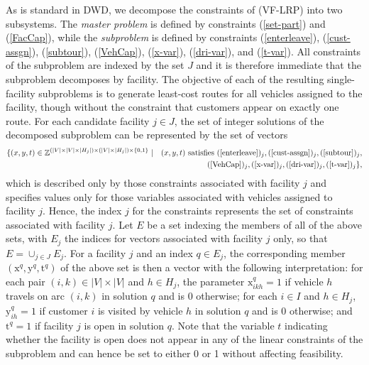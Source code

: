 \documentclass[graybox]{./styles/svmult}
\newcommand{\Z}{\mathbb{Z}}
\begin{document}
As is standard in DWD, we decompose the constraints of (VF-LRP) into
two subsystems. The \emph{master problem} is defined by constraints
(\ref{set-part}) and (\ref{FacCap}), while the \emph{subproblem} is
defined by constraints (\ref{enterleave}), (\ref{cust-assgn}),
(\ref{subtour}), (\ref{VehCap}), (\ref{x-var}), (\ref{dri-var}), and
(\ref{t-var}). All constraints of the subproblem are indexed by the
set $J$ and it is therefore immediate that the subproblem decomposes
by facility. The objective of each of the resulting single-facility
subproblems is to generate least-cost routes for all vehicles assigned
to the facility, though without the constraint that customers appear
on exactly one route. For each candidate facility $j \in J$, the set
of integer solutions of the decomposed subproblem can be represented
by the set of vectors
\begin{eqnarray*}
\{(x, y, t) \in \Z^{(|V|\times |V| \times |H_j|) \times (|V| \times
  |H_j|) \times \{0, 1\}}  \mid & &   (x, y, t) \mbox{ satisfies } (\ref{enterleave})_j, 
 (\ref{cust-assgn})_j, (\ref{subtour})_j, \\
& & (\ref{VehCap})_j, (\ref{x-var})_j,
(\ref{dri-var})_j, (\ref{t-var})_j\},
\end{eqnarray*}
which is described only by those constraints associated with facility
$j$ and specifies values only for those variables associated with
vehicles assigned to facility $j$. Hence, the index $j$ for the
constraints represents the set of constraints associated with facility
$j$. Let $E$ be a set indexing the members of all of the above sets,
with $E_j$ the indices for vectors associated with facility $j$ only,
so that $E = \cup_{j \in J} E_j$. For a facility $j$ and an index $q
\in E_j$, the corresponding member $(\mbox{x}^q, \mbox{y}^q,
\mbox{t}^q)$ of the above set is then a vector with the following
interpretation: for each pair $(i, k) \in |V| \times |V|$ and $h \in
H_j$, the parameter $\mbox{x}_{ikh}^q = 1$ if vehicle $h$ travels on
arc $(i,k)$ in solution $q$ and is 0 otherwise; for each $i \in I$ and
$h \in H_j$, $\mbox{y}_{ih}^q = 1$ if customer $i$ is visited by
vehicle $h$ in solution $q$ and is 0 otherwise; and $\mbox{t}^q =1$ if
facility $j$ is open in solution $q$. Note that the variable $t$
indicating whether the facility is open does not appear in any of the
linear constraints of the subproblem and can hence be set to either 0
or 1 without affecting feasibility. 
\end{document}

